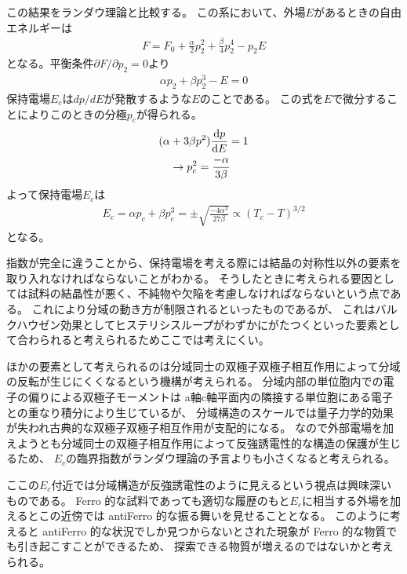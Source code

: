 \documentclass[11pt,dvipdfmx,a4paper]{jsarticle}
\begin{document}
この結果をランダウ理論と比較する。
この系において、外場\(E\)があるときの自由エネルギーは
\begin{align}
    F = F_0 + \frac{\alpha}{2} p_2^2 + \frac{\beta}{4} p_2^4 -p_2E
\end{align}
となる。平衡条件\(\partial F/\partial p_2 = 0\)より
\begin{align}
    \alpha p_2 + \beta p_2^3 - E = 0
\end{align}
保持電場\(E_c\)は\(dp/dE\)が発散するような\(E\)のことである。
この式を\(E\)で微分することによりこのときの分極\(p_c\)が得られる。
\begin{align}
    &(\alpha+3\beta p^2)\dv{p}{E} = 1 \\
    &\quad \rightarrow p_c^2 = \frac{-\alpha}{3\beta}
\end{align}
よって保持電場\(E_c\)は
\begin{align}
    E_c = \alpha p_c + \beta p_c^3 = \pm\sqrt{\frac{-4\alpha^3}{27\beta}} \propto (T_c-T)^{3/2}
\end{align}
となる。

指数が完全に違うことから、保持電場を考える際には結晶の対称性以外の要素を取り入れなければならないことがわかる。
そうしたときに考えられる要因としては試料の結晶性が悪く、不純物や欠陥を考慮しなければならないという点である。
これにより分域の動き方が制限されるといったものであるが、
これはバルクハウゼン効果としてヒステリシスループがわずかにがたつくといった要素として合わられると考えられるためここでは考えにくい。

ほかの要素として考えられるのは分域同士の双極子双極子相互作用によって分域の反転が生じにくくなるという機構が考えられる。
分域内部の単位胞内での電子の偏りによる双極子モーメントは a軸c軸平面内の隣接する単位胞にある電子との重なり積分により生じているが、
分域構造のスケールでは量子力学的効果が失われ古典的な双極子双極子相互作用が支配的になる。
なので外部電場を加えようとも分域同士の双極子相互作用によって反強誘電性的な構造の保護が生じるため、
\(E_c\)の臨界指数がランダウ理論の予言よりも小さくなると考えられる。

ここの\(E_c\)付近では分域構造が反強誘電性のように見えるという視点は興味深いものである。
Ferro 的な試料であっても適切な履歴のもと\(E_c\)に相当する外場を加えるとこの近傍では antiFerro 的な振る舞いを見せることとなる。
このように考えると antiFerro 的な状況でしか見つからないとされた現象が Ferro 的な物質でも引き起こすことができるため、
探索できる物質が増えるのではないかと考えられる。
\end{document}
